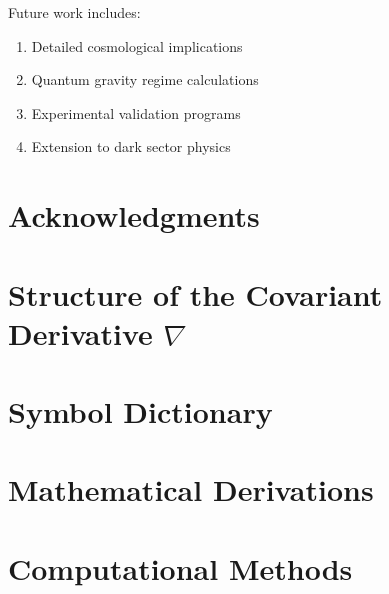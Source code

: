 \documentclass[12pt,a4paper]{article}
\begin{document}
Future work includes:
\begin{enumerate}
    \item Detailed cosmological implications
    \item Quantum gravity regime calculations
    \item Experimental validation programs
    \item Extension to dark sector physics
\end{enumerate}


\section*{Acknowledgments}



\appendix

\section{Structure of the Covariant Derivative $\nabla$}
\label{app:nabla}



\section{Symbol Dictionary}
\label{app:symbols}



\section{Mathematical Derivations}
\label{app:derivations}


\section{Computational Methods}
\label{app:computational}





\end{document}
